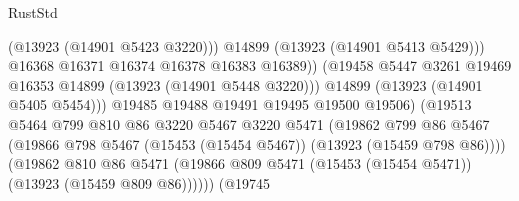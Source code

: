 \begin{lexlean}{RustStd}
\begin{coremodule}
                                                (@13923 (@14901 @5423 @3220)))
                                              @14899
                                              (@13923 (@14901 @5413 @5429)))
                                            @16368
                                            @16371
                                            @16374
                                            @16378
                                            @16383
                                            @16389))
                                        (@19458
                                          @5447
                                          @3261
                                          @19469
                                          @16353
                                          @14899
                                          (@13923 (@14901 @5448 @3220)))
                                        @14899
                                        (@13923 (@14901 @5405 @5454)))
                                      @19485
                                      @19488
                                      @19491
                                      @19495
                                      @19500
                                      @19506)
                                    (@19513
                                      @5464
                                      @799
                                      @810
                                      @86
                                      @3220
                                      @5467
                                      @3220
                                      @5471
                                      (@19862
                                        @799
                                        @86
                                        @5467
                                        (@19866
                                          @798
                                          @5467
                                          (@15453 (@15454 @5467))
                                          (@13923 (@15459 @798 @86))))
                                      (@19862
                                        @810
                                        @86
                                        @5471
                                        (@19866
                                          @809
                                          @5471
                                          (@15453 (@15454 @5471))
                                          (@13923 (@15459 @809 @86))))))
                                  (@19745

\end{coremodule}
\end{lexlean}
